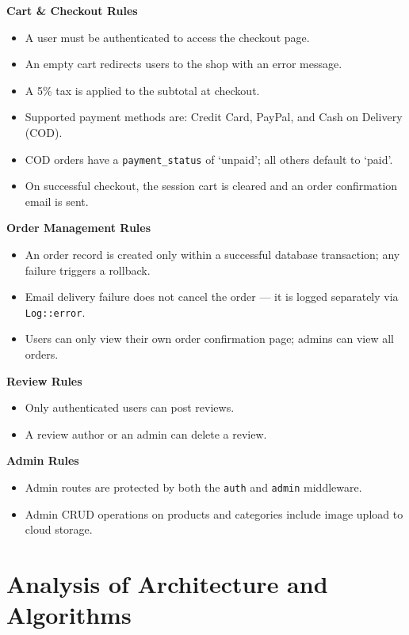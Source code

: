 \textbf{Cart \& Checkout Rules}
\begin{itemize}
    \item A user must be authenticated to access the checkout page.
    \item An empty cart redirects users to the shop with an error message.
    \item A 5\% tax is applied to the subtotal at checkout.
    \item Supported payment methods are: Credit Card, PayPal, and Cash on Delivery (COD).
    \item COD orders have a \texttt{payment\_status} of `unpaid'; all others default to `paid'.
    \item On successful checkout, the session cart is cleared and an order confirmation email is sent.
\end{itemize}

\textbf{Order Management Rules}
\begin{itemize}
    \item An order record is created only within a successful database transaction; any failure triggers a rollback.
    \item Email delivery failure does not cancel the order --- it is logged separately via \texttt{Log::error}.
    \item Users can only view their own order confirmation page; admins can view all orders.
\end{itemize}

\textbf{Review Rules}
\begin{itemize}
    \item Only authenticated users can post reviews.
    \item A review author or an admin can delete a review.
\end{itemize}

\textbf{Admin Rules}
\begin{itemize}
    \item Admin routes are protected by both the \texttt{auth} and \texttt{admin} middleware.
    \item Admin CRUD operations on products and categories include image upload to cloud storage.
\end{itemize}

\newpage
\section{Analysis of Architecture and Algorithms}


